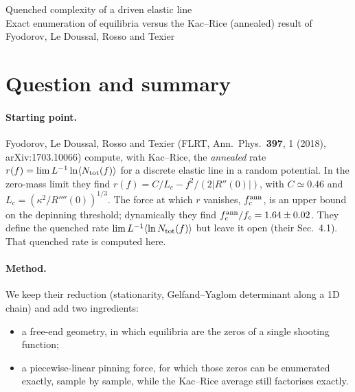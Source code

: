 \documentclass[10pt,a4paper]{article}
\begin{document}
\begin{center}
{\Large Quenched complexity of a driven elastic line}\\[3pt]
{\small Exact enumeration of equilibria versus the Kac--Rice (annealed) result of Fyodorov, Le Doussal, Rosso and Texier}
\end{center}

\section{Question and summary}

\paragraph{Starting point.}
Fyodorov, Le Doussal, Rosso and Texier (FLRT, Ann.\ Phys.\ \textbf{397}, 1 (2018), arXiv:1703.10066) compute, with Kac--Rice, the \emph{annealed} rate $r(f)=\lim L^{-1}\ln\langle N_{\rm tot}(f)\rangle$ for a discrete elastic line in a random potential.
In the zero-mass limit they find $r(f)=C/L_c-f^2/(2|R''(0)|)$, with $C\simeq0.46$ and $L_c=(\kappa^2/R''''(0))^{1/3}$.
The force at which $r$ vanishes, $f_c^{\rm ann}$, is an upper bound on the depinning threshold; dynamically they find $f_c^{\rm ann}/f_c=1.64\pm0.02$.
They define the quenched rate $\lim L^{-1}\langle\ln N_{\rm tot}(f)\rangle$ but leave it open (their Sec.~4.1).
That quenched rate is computed here.

\paragraph{Method.}
We keep their reduction (stationarity, Gelfand--Yaglom determinant along a 1D chain) and add two ingredients:
\begin{itemize}
\item a free-end geometry, in which equilibria are the zeros of a single shooting function;
\item a piecewise-linear pinning force, for which those zeros can be enumerated exactly, sample by sample, while the Kac--Rice average still factorises exactly.
\end{itemize}
\end{document}
